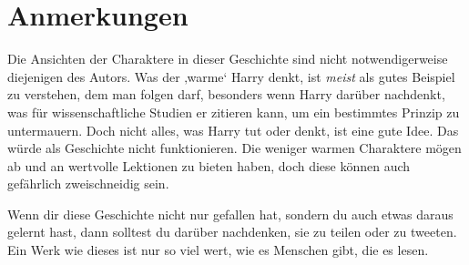 


\section*{Anmerkungen}
Die Ansichten der Charaktere in dieser Geschichte sind nicht notwendigerweise diejenigen des Autors. Was der ‚warme‘ Harry denkt, ist \emph{meist} als gutes Beispiel zu verstehen, dem man folgen darf, besonders wenn Harry darüber nachdenkt, was für wissenschaftliche Studien er zitieren kann, um ein bestimmtes Prinzip zu untermauern. Doch nicht alles, was Harry tut oder denkt, ist eine gute Idee. Das würde als Geschichte nicht funktionieren. Die weniger warmen Charaktere mögen ab und an wertvolle Lektionen zu bieten haben, doch diese können auch gefährlich zweischneidig sein.


Wenn dir diese Geschichte nicht nur gefallen hat, sondern du auch etwas daraus gelernt hast, dann solltest du darüber nachdenken, sie zu teilen oder zu tweeten. Ein Werk wie dieses ist nur so viel wert, wie es Menschen gibt, die es lesen.
